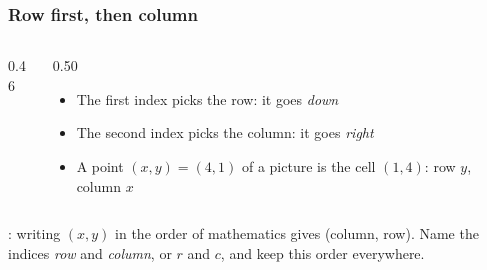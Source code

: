 \documentclass[aspectratio=169,10pt,compress]{beamer}
\begin{document}
\begin{frame}[t,fragile] \frametitle{Row first, then column}
	\begin{columns}[T]
		\begin{column}{0.46\textwidth}
			\begin{center}
			\end{center}
		\end{column}
		\begin{column}{0.50\textwidth}
			\begin{itemize}\small
				\item The first index picks the row: it goes \emph{down}
				\item The second index picks the column: it goes \emph{right}
				\item A point $(x, y) = (4, 1)$ of a picture is the cell $(1, 4)$: row $y$, column $x$
			\end{itemize}
		\end{column}
	\end{columns}

	\vspace{1em}
	\small {}: writing $(x, y)$ in the order of mathematics gives (column, row). Name the indices
	\emph{row} and \emph{column}, or $r$ and $c$, and keep this order everywhere.
\end{frame}
\end{document}
